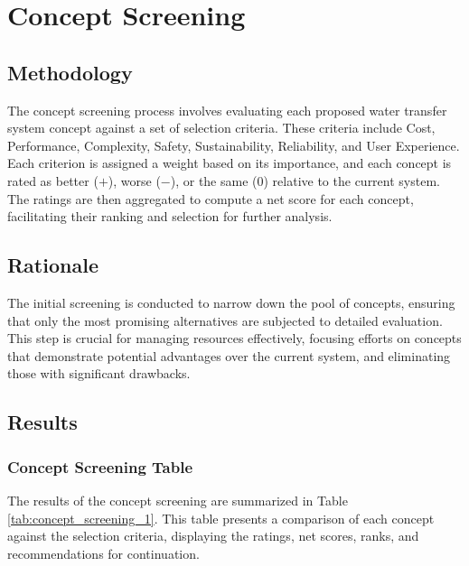 \documentclass[12pt]{article}
\begin{document}
\section{Concept Screening}
\label{sec:concept_screening}

\subsection{Methodology}
\label{subsec:concept_screening_methodology}

The concept screening process involves evaluating each proposed water transfer system concept against a set of selection criteria. These criteria include Cost, Performance, Complexity, Safety, Sustainability, Reliability, and User Experience. Each criterion is assigned a weight based on its importance, and each concept is rated as better ($+$), worse ($-$), or the same ($0$) relative to the current system. The ratings are then aggregated to compute a net score for each concept, facilitating their ranking and selection for further analysis.

\subsection{Rationale}
\label{subsec:concept_screening_rationale}

The initial screening is conducted to narrow down the pool of concepts, ensuring that only the most promising alternatives are subjected to detailed evaluation. This step is crucial for managing resources effectively, focusing efforts on concepts that demonstrate potential advantages over the current system, and eliminating those with significant drawbacks.

\subsection{Results}
\label{subsec:concept_screening_results}

\subsubsection{Concept Screening Table}
\label{subsubsec:concept_screening_table}

The results of the concept screening are summarized in Table \ref{tab:concept_screening_1}. This table presents a comparison of each concept against the selection criteria, displaying the ratings, net scores, ranks, and recommendations for continuation.
\end{document}
